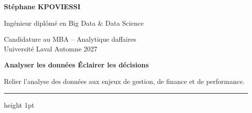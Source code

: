 \documentclass[10pt,a4paper]{article}
\begin{document}
\fontsize{10pt}{12.3pt}\selectfont
\sloppy

\begin{minipage}[t]{0.52\textwidth}
{\LARGE\bfseries\color{accentdark} Stéphane KPOVIESSI}\par
\vspace{1pt}
{\large\color{accent}Ingénieur diplômé en Big Data \& Data Science}\par
\vspace{1pt}
{\color{muted}Candidature au MBA -- Analytique d\textquotesingle affaires\\ Université Laval \textbullet{} Automne 2027}
\end{minipage}
\hfill
\begin{minipage}[t]{0.42\textwidth}
\raggedleft
\vspace{2pt}
{\normalsize\bfseries\color{accent}Analyser les données \textbullet{} Éclairer les décisions}\par
\vspace{3pt}
{\small\color{muted}
Relier l'analyse des données aux enjeux de gestion, de finance et de performance.
}
\end{minipage}

\vspace{5pt}
{\color{rule}\hrule height 1pt}
\vspace{6pt}
\end{document}
